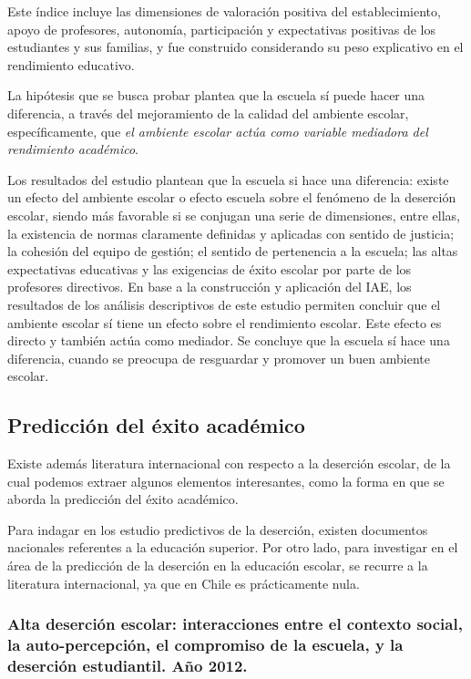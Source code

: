 Este índice incluye las dimensiones de valoración positiva del establecimiento, apoyo de profesores, autonomía, participación y expectativas positivas de los estudiantes y sus familias, y fue construido considerando su peso explicativo en el rendimiento educativo.

La hipótesis que se busca probar plantea que la escuela sí puede hacer una diferencia, a través del mejoramiento de la calidad del ambiente escolar, específicamente, que \textit{el ambiente escolar actúa como variable mediadora del rendimiento académico}. 

Los resultados del estudio plantean que la escuela si hace una diferencia: existe un efecto del ambiente escolar o efecto escuela sobre el fenómeno de la deserción escolar, siendo más favorable si se conjugan una serie de dimensiones, entre ellas, la existencia de normas claramente definidas y aplicadas con sentido de justicia; la cohesión del equipo de gestión; el sentido de pertenencia a la escuela; las altas expectativas educativas y las exigencias de éxito escolar por parte de los profesores directivos. En base a la construcción y aplicación del IAE, los resultados de los análisis descriptivos de este estudio permiten concluir que el ambiente escolar sí tiene un efecto sobre el rendimiento escolar. Este efecto es directo y también actúa como mediador. Se concluye que la escuela sí hace una diferencia, cuando se preocupa de resguardar y promover un buen ambiente escolar. 

\subsection{Predicción del éxito académico}
Existe además literatura internacional con respecto a la deserción escolar, de la cual podemos extraer algunos elementos interesantes, como la forma en que se aborda la predicción del éxito académico. 

Para indagar en los estudio predictivos de la deserción, existen documentos nacionales referentes a la educación superior. Por otro lado, para investigar en el área de la predicción de la deserción en la educación escolar, se recurre a la literatura internacional, ya que en Chile es prácticamente nula. 

\subsubsection{Alta deserción escolar: interacciones entre el contexto social, la auto-percepción, el compromiso de la escuela, y la deserción estudiantil. Año 2012.}

